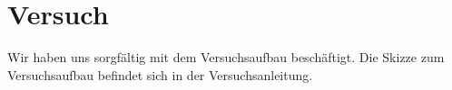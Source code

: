 \section{Versuch}
\label{sec:versuch}
Wir haben uns sorgfältig mit dem Versuchsaufbau beschäftigt. Die Skizze zum Versuchsaufbau befindet sich in der Versuchsanleitung.